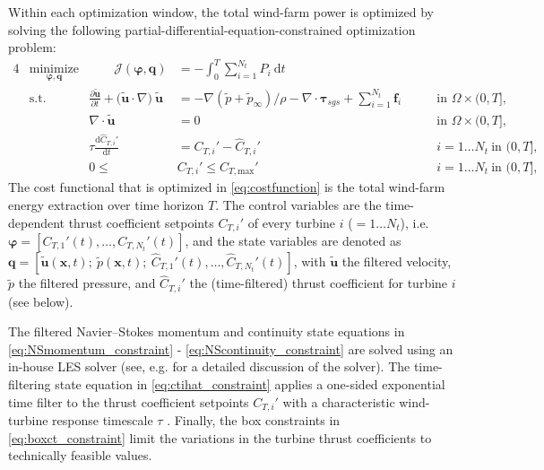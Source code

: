 \documentclass[wes, manuscript]{copernicus}
\begin{document}
Within each optimization window, the total wind-farm power is optimized by solving the following partial-differential-equation-constrained optimization problem: 
\begin{alignat}{4}
& \underset{\boldsymbol{\varphi}, \boldsymbol{q}}{\text{minimize}}  & \qquad  \mathscr{J}(\boldsymbol{\varphi}, \boldsymbol{q}) &= - \int_{0}^{T} \sum_{i=1}^{N_t} P_i ~\text{d}t  & \label{eq:costfunction}\\
& \text{s.t.}                      			&         \frac{\partial \widetilde{\boldsymbol{u}}}{\partial t} + \big(\widetilde{\boldsymbol{u}} \cdot \nabla \big)~ \widetilde{\boldsymbol{u}} &= - \nabla (\widetilde{p} + \widetilde{p}_\infty) / \rho - \nabla \cdot \boldsymbol{\tau}_{sgs} + \sum_{i=1}^{N_t} \boldsymbol{f}_i \qquad  & \text{in } \Omega \times (0,T], \label{eq:NSmomentum_constraint} \\
&                                                   &        \nabla \cdot \widetilde{\boldsymbol{u}}&=0 									        & \text{in } \Omega \times (0,T], \label{eq:NScontinuity_constraint}\\
&                                                   &        \tau \frac{\text{d} \widehat{C}_{T,i}'}{\text{d} t} &=C_{T,i}' - \widehat{C}_{T,i}' 								& i=1\dots N_t~\text{in } (0,T],  \label{eq:ctihat_constraint}\\
&                                                   &       0 \leq~ &C_{T,i}' \leq C_{T,\text{max}}'				& i=1\dots N_t~\text{in } (0,T],  \label{eq:boxct_constraint}
\end{alignat}
The cost functional that is optimized in \eqref{eq:costfunction} is the total wind-farm energy extraction over time horizon $T$. The control variables are the time-dependent thrust coefficient setpoints $C_{T,i}'$ of every turbine $i$ ($=1 \dots N_t$), i.e. $\boldsymbol{\varphi} = [C_{T,1}'(t), \dots, C_{T,N_t}'(t) ]$, and the state variables are denoted as  $\boldsymbol{q}=[\widetilde{\boldsymbol{u}}(\boldsymbol{x},t);~ \widetilde{p}(\boldsymbol{x},t);~ \widehat{C}_{T,1}'(t), \dots, \widehat{C}_{T,N_t}'(t)]$, with $\widetilde{\boldsymbol{u}}$ the filtered velocity, $\widetilde{p}$ the filtered pressure, and $\widehat{C}_{T,i}'$ the (time-filtered) thrust coefficient for turbine $i$ (see below). 

The filtered Navier--Stokes momentum and continuity state equations in \eqref{eq:NSmomentum_constraint} - \eqref{eq:NScontinuity_constraint} are solved using an in-house LES solver (see, e.g. \citealp{calaf2010large, meyers2010large, goit2016optimal} for a detailed discussion of the solver). The time-filtering state equation in \eqref{eq:ctihat_constraint} applies a one-sided exponential time filter to the thrust coefficient setpoints $C_{T,i}'$ with a characteristic wind-turbine response timescale $\tau$ \citep{munters2016effect}. Finally, the box constraints in \eqref{eq:boxct_constraint} limit the variations in the turbine thrust coefficients to technically feasible values. 
\end{document}
